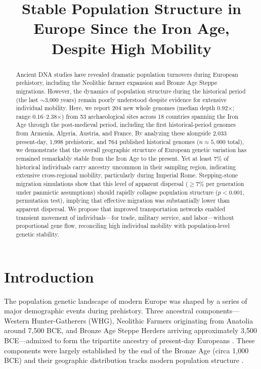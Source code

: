 \documentclass[11pt]{article}
\title{Stable Population Structure in Europe Since the Iron Age, Despite High Mobility}
\author{}
\date{}
\begin{document}
\maketitle

\begin{abstract}
Ancient DNA studies have revealed dramatic population turnovers during European prehistory, including the Neolithic farmer expansion and Bronze Age Steppe migrations. However, the dynamics of population structure during the historical period (the last $\sim$3,000 years) remain poorly understood despite evidence for extensive individual mobility. Here, we report 204 new whole genomes (median depth 0.92$\times$; range 0.16--2.38$\times$) from 53 archaeological sites across 18 countries spanning the Iron Age through the post-medieval period, including the first historical-period genomes from Armenia, Algeria, Austria, and France. By analyzing these alongside 2,033 present-day, 1,998 prehistoric, and 764 published historical genomes ($n \approx 5{,}000$ total), we demonstrate that the overall geographic structure of European genetic variation has remained remarkably stable from the Iron Age to the present. Yet at least 7\% of historical individuals carry ancestry uncommon in their sampling region, indicating extensive cross-regional mobility, particularly during Imperial Rome. Stepping-stone migration simulations show that this level of apparent dispersal ($\geq$7\% per generation under panmictic assumptions) should rapidly collapse population structure ($p < 0.001$, permutation test), implying that effective migration was substantially lower than apparent dispersal. We propose that improved transportation networks enabled transient movement of individuals---for trade, military service, and labor---without proportional gene flow, reconciling high individual mobility with population-level genetic stability.
\end{abstract}

\section{Introduction}

The population genetic landscape of modern Europe was shaped by a series of major demographic events during prehistory. Three ancestral components---Western Hunter-Gatherers (WHG), Neolithic Farmers originating from Anatolia around 7,500 BCE, and Bronze Age Steppe Herders arriving approximately 3,500 BCE---admixed to form the tripartite ancestry of present-day Europeans \citep{lazaridis2014ancient, haak2015massive, allentoft2015population, mathieson2015genome}. These components were largely established by the end of the Bronze Age (circa 1,000 BCE) and their geographic distribution tracks modern population structure \citep{fu2016genetic, lazaridis2016genomic, posth2023paleogenomics}.
\end{document}
